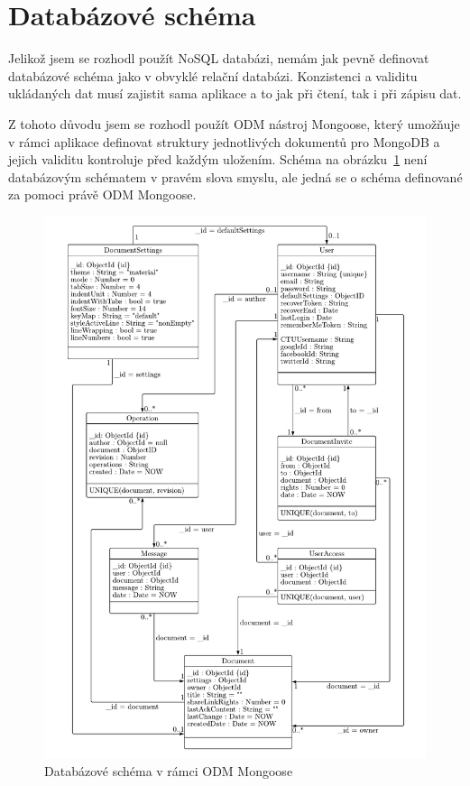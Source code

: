 
\section{Databázové schéma}\label{sec:databázovéSchéma}

Jelikož jsem se rozhodl použít \gls{NoSQL} databázi, nemám jak pevně definovat databázové schéma jako v obvyklé relační databázi.
Konzistenci a validitu ukládaných dat musí zajistit sama aplikace a to jak při čtení, tak i při zápisu dat.

Z tohoto důvodu jsem se rozhodl použít \gls{ODM} nástroj Mongoose, který umožňuje v rámci aplikace definovat struktury jednotlivých dokumentů pro MongoDB a jejich validitu kontroluje před každým uložením.
Schéma na obrázku~\ref{fig:DB_model} není databázovým schématem v pravém slova smyslu, ale jedná se o schéma definované za pomoci právě \gls{ODM} Mongoose.

\begin{figure}[ht]
    \centering
    \includegraphics[width=\textwidth]{partials/navrh/DB_model.pdf}
    \caption{Databázové schéma v rámci ODM Mongoose}\label{fig:DB_model}
\end{figure}


